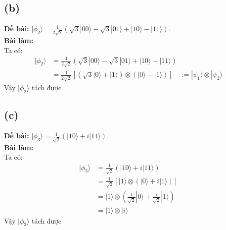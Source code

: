 \subsection{(b)}
\textbf{Đề bài:} $|\phi_{2}\rangle=\frac{1}{2\sqrt{2}}(\sqrt{3}|00\rangle-\sqrt{3}|01\rangle+|10\rangle-|11\rangle)$.\\
\textbf{Bài làm:}\\
Ta có:
\begin{align*}
    |\phi_{2}\rangle & = \frac{1}{2\sqrt{2}}\left(\sqrt{3}|00\rangle-\sqrt{3}|01\rangle+|10\rangle-|11\rangle\right)       \\
                     & = \frac{1}{2\sqrt{2}}\left[(\sqrt{3}|0\rangle+|1\rangle) \otimes (|0\rangle-|1\rangle)\right] \quad
    := |\psi_1\rangle \otimes |\psi_2\rangle
\end{align*}
Vậy $|\phi_{2}\rangle$ tách được

\subsection{(c)}
\textbf{Đề bài:} $|\phi_{3}\rangle=\frac{1}{\sqrt{2}}(|10\rangle+i|11\rangle)$.\\
\textbf{Bài làm:}\\
Ta có:
\begin{align*}
    |\phi_{3}\rangle & =\frac{1}{\sqrt{2}}\left(|10\rangle+i|11\rangle\right)                                     \\
                     & = \frac{1}{\sqrt{2}}\left[|1\rangle \otimes \left(|0\rangle + i|1\rangle\right) \right]    \\
                     & = |1\rangle \otimes \left(\frac{1}{\sqrt{2}}|0\rangle + \frac{i}{\sqrt{2}}|1\rangle\right) \\
                     & = |1\rangle \otimes |i\rangle
\end{align*}
Vậy $|\phi_{3}\rangle$ tách được

